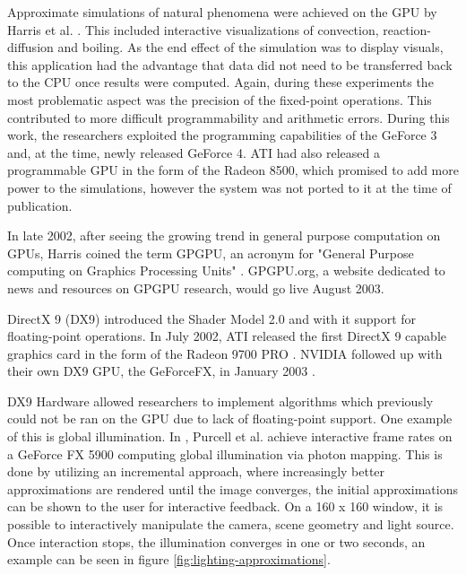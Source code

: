 Approximate simulations of natural phenomena were achieved on the GPU by Harris et al. \cite {physics_simulations_gpgpu}. This included interactive visualizations of convection, reaction-diffusion and boiling. As the end effect of the simulation was to display visuals, this application had the advantage that data did not need to be transferred back to the CPU once results were computed. Again, during these experiments the most problematic aspect was the precision of the fixed-point operations. This contributed to more difficult programmability and arithmetic errors. During this work, the researchers exploited the programming capabilities of the GeForce 3 and, at the time, newly released GeForce 4. ATI had also released a programmable GPU in the form of the Radeon 8500, which promised to add more power to the simulations, however the system was not ported to it at the time of publication. 

In late 2002, after seeing the growing trend in general purpose computation on GPUs, Harris coined the term GPGPU, an acronym for "General Purpose computing on Graphics Processing Units" \cite{brief_history_gpgpu}. GPGPU.org, a website dedicated to news and resources on GPGPU research, would go live August 2003.

DirectX 9 (DX9) introduced the Shader Model 2.0 and with it support for floating-point operations. In July 2002, ATI released the first DirectX 9 capable graphics card in the form of the Radeon 9700 PRO \cite{ati_9700_pro}. NVIDIA followed up with their own DX9 GPU, the GeForceFX, in January 2003 \cite{geforcefx}. 

DX9 Hardware allowed researchers to implement algorithms which previously could not be ran on the GPU due to lack of floating-point support. One example of this is global illumination. In \cite{photon_mapping_gpgpu}, Purcell et al. achieve interactive frame rates on a GeForce FX 5900 computing global illumination via photon mapping. This is done by utilizing an incremental approach, where increasingly better approximations are rendered until the image converges, the initial approximations can be shown to the user for interactive feedback. On a 160 x 160 window, it is possible to interactively manipulate the camera, scene geometry and light source. Once interaction stops, the illumination converges in one or two seconds, an example can be seen in figure \ref{fig:lighting-approximations}. 

